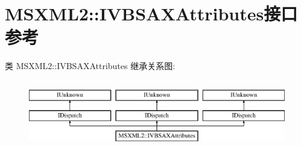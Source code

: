 \hypertarget{interface_m_s_x_m_l2_1_1_i_v_b_s_a_x_attributes}{}\section{M\+S\+X\+M\+L2\+:\+:I\+V\+B\+S\+A\+X\+Attributes接口 参考}
\label{interface_m_s_x_m_l2_1_1_i_v_b_s_a_x_attributes}
类 M\+S\+X\+M\+L2\+:\+:I\+V\+B\+S\+A\+X\+Attributes 继承关系图\+:\begin{figure}[H]
\begin{center}
\leavevmode
\includegraphics[height=3.000000cm]{interface_m_s_x_m_l2_1_1_i_v_b_s_a_x_attributes}
\end{center}
\end{figure}
